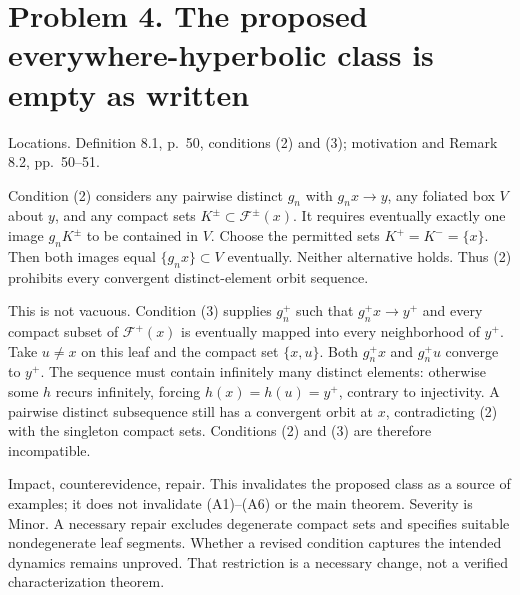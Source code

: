 \documentclass[10pt]{article}
\begin{document}
\section*{Problem 4. The proposed everywhere-hyperbolic class is empty as written}
Locations. Definition 8.1, p. 50, conditions (2) and (3); motivation and Remark 8.2, pp. 50–51.\par
Condition (2) considers any pairwise distinct \(g_n\) with \(g_nx\to y\), any foliated box \(V\) about \(y\), and any compact sets \(K^\pm\subset\mathcal F^\pm(x)\). It requires eventually exactly one image \(g_nK^\pm\) to be contained in \(V\). Choose the permitted sets \(K^+=K^-=\{x\}\). Then both images equal \(\{g_nx\}\subset V\) eventually. Neither alternative holds. Thus (2) prohibits every convergent distinct-element orbit sequence.\par
This is not vacuous. Condition (3) supplies \(g_n^+\) such that \(g_n^+x\to y^+\) and every compact subset of \(\mathcal F^+(x)\) is eventually mapped into every neighborhood of \(y^+\). Take \(u\ne x\) on this leaf and the compact set \(\{x,u\}\). Both \(g_n^+x\) and \(g_n^+u\) converge to \(y^+\). The sequence must contain infinitely many distinct elements: otherwise some \(h\) recurs infinitely, forcing \(h(x)=h(u)=y^+\), contrary to injectivity. A pairwise distinct subsequence still has a convergent orbit at \(x\), contradicting (2) with the singleton compact sets. Conditions (2) and (3) are therefore incompatible.\par
Impact, counterevidence, repair. This invalidates the proposed class as a source of examples; it does not invalidate (A1)–(A6) or the main theorem. Severity is Minor. A necessary repair excludes degenerate compact sets and specifies suitable nondegenerate leaf segments. Whether a revised condition captures the intended dynamics remains unproved. That restriction is a necessary change, not a verified characterization theorem.\par
\end{document}
